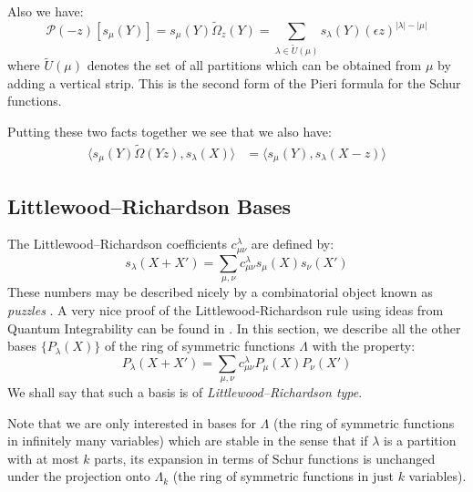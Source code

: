 \documentclass[12pt,dvips]{amsart}
\begin{document}
\par\bigskip
Also we have:
\begin{equation} \label{pieri2}
\mathcal{P}(-z)[s_\mu(Y)] = s_\mu(Y) \tilde{\Omega}_z(Y) = \sum_{\lambda \in \tilde{U}(\mu)} s_\lambda(Y)(\epsilon z)^{|\lambda| - |\mu|} 
\end{equation}
where $\tilde{U}(\mu)$ denotes the set of all partitions which can be obtained from $\mu$ by adding a vertical strip. This is the second form of the Pieri formula for the Schur functions.

\par\bigskip

Putting these two facts together we see that we also have:
\begin{align*} 
\langle s_\mu(Y)\tilde{\Omega}(Yz), s_\lambda(X) \rangle & =  \langle s_\mu(Y), s_\lambda(X-z) \rangle 
\end{align*}




\par\bigskip

\subsection{Littlewood--Richardson Bases}


The Littlewood--Richardson coefficients $c^{\lambda}_{\mu \nu}$ are defined by:
$$ s_\lambda(X + X') = \sum_{\mu, \nu} c^{\lambda}_{\mu\nu} s_\mu(X) s_\nu(X')$$
These numbers may be described nicely by a combinatorial object known as {\it puzzles} \cite{KEVIN}. A very nice proof of the Littlewood-Richardson rule using ideas from Quantum Integrability can be found in \cite{ZINN}.   %
In this section, we describe all the other bases $\{P_\lambda(X)\}$ of the ring of symmetric functions $\Lambda$ with the property:
$$ P_\lambda(X + X') = \sum_{\mu, \nu} c^{\lambda}_{\mu \nu}  P_\mu(X) P_\nu(X')$$
We shall say that such a basis is of {\it Littlewood--Richardson type}. 

Note that we are only interested in bases for $\Lambda$ (the ring of symmetric functions in infinitely many variables) which are stable in the sense that if $\lambda$ is a partition with at most $k$ parts, its expansion in terms of Schur functions is unchanged under the projection onto $\Lambda_k$ (the ring of symmetric functions in just $k$ variables).

\par\bigskip
\end{document}
